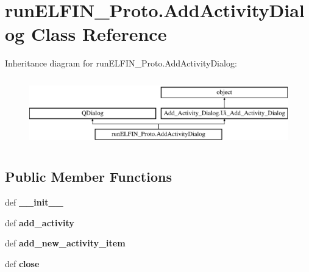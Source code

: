 \hypertarget{classrunELFIN__Proto_1_1AddActivityDialog}{\section{run\-E\-L\-F\-I\-N\-\_\-\-Proto.\-Add\-Activity\-Dialog Class Reference}
\label{classrunELFIN__Proto_1_1AddActivityDialog}
}
Inheritance diagram for run\-E\-L\-F\-I\-N\-\_\-\-Proto.\-Add\-Activity\-Dialog\-:\begin{figure}[H]
\begin{center}
\leavevmode
\includegraphics[height=3.000000cm]{classrunELFIN__Proto_1_1AddActivityDialog}
\end{center}
\end{figure}
\subsection*{Public Member Functions}
\begin{DoxyCompactItemize}
\item 
\hypertarget{classrunELFIN__Proto_1_1AddActivityDialog_a471b245c26d4148a8c9575e8ce075c5b}{def {\bfseries \-\_\-\-\_\-init\-\_\-\-\_\-}}\label{classrunELFIN__Proto_1_1AddActivityDialog_a471b245c26d4148a8c9575e8ce075c5b}

\item 
\hypertarget{classrunELFIN__Proto_1_1AddActivityDialog_a154107cc596262338c88ecd63713cef5}{def {\bfseries add\-\_\-activity}}\label{classrunELFIN__Proto_1_1AddActivityDialog_a154107cc596262338c88ecd63713cef5}

\item 
\hypertarget{classrunELFIN__Proto_1_1AddActivityDialog_a2dbd21f4cd94130413857ac9954fc325}{def {\bfseries add\-\_\-new\-\_\-activity\-\_\-item}}\label{classrunELFIN__Proto_1_1AddActivityDialog_a2dbd21f4cd94130413857ac9954fc325}

\item 
\hypertarget{classrunELFIN__Proto_1_1AddActivityDialog_a13af5c9e50240aa9b2ec22709ff4b8be}{def {\bfseries close}}\label{classrunELFIN__Proto_1_1AddActivityDialog_a13af5c9e50240aa9b2ec22709ff4b8be}

\end{DoxyCompactItemize}

